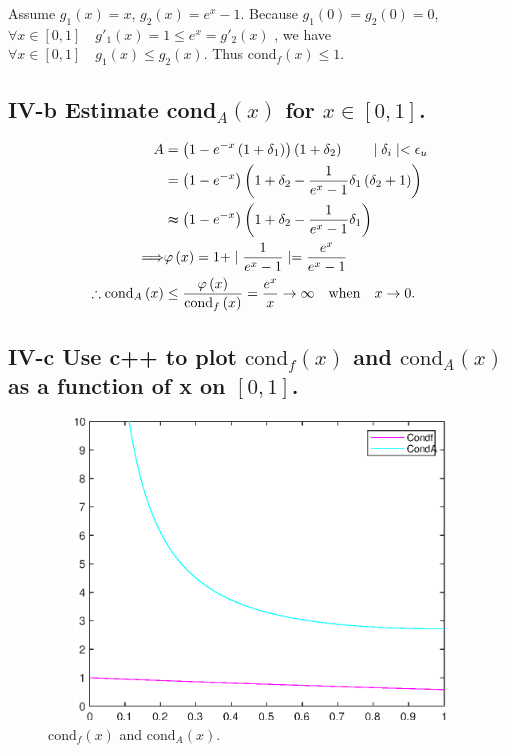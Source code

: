 \documentclass[twoside,a4paper]{article}
\begin{document}
Assume $g_1\left( x \right) =x$, $g_2\left( x \right)=e^{x}-1 $. 
Because $g_1\left( 0 \right)=g_2\left( 0 \right)= 0 $, $\forall x\in[0,1]\quad g'_1\left( x \right)=1\le e^{x}=g'_2\left( x \right)$
, we have $\forall x\in[0,1]\quad g_1\left( x \right)\le g_2\left( x \right)  $. 
Thus $\mathrm{cond}_f\left( x \right)\le 1 $. 

\subsection*{IV-b \small{Estimate cond$_A\left( x \right) $ for $x\in[0,1]$.}}
\begin{equation*}
	\begin{split}
		A&=\left( 1-e^{-x}\left( 1+ \delta_1\right)  \right) \left( 1+\delta_2 \right) \qquad \mid \delta_i \mid<\epsilon_u\\
		 &=\left( 1-e^{-x} \right)\left( 1+\delta_2-\frac{1}{e^{x}-1}\delta_1\left( \delta_2+1 \right)  \right)\\
		 &\thickapprox\left( 1-e^{-x} \right)\left( 1+\delta_2-\frac{1}{e^{x}-1}\delta_1 \right)\\
		\Longrightarrow&\varphi\left( x \right) =  1+ \mid \frac{1}{e^{x}-1} \mid=\frac{e^{x}}{e^{x}-1}\\
		\therefore  \mathrm{cond}_A\left( x \right)&\le \frac{\varphi\left( x \right) }{\mathrm{cond}_f\left( x \right) }
		=\frac{e^{x}}{x}\to \infty\quad \mathrm{when}\quad x\to 0.
	\end{split}	
\end{equation*}
\subsection*{IV-c \small{Use c++ to plot $\mathrm{cond}_f\left( x \right) $ and $\mathrm{cond}_A\left( x \right) $ as a function of x on $[0,1]$.}}

\begin{figure}[ht]
        \centering
        \includegraphics[width=15cm, height=8cm]{./Plot/result.eps}
	\caption{$\mathrm{cond}_f\left( x \right)$ and $\mathrm{cond}_A\left( x \right) $.}
\end{figure}
\end{document}
